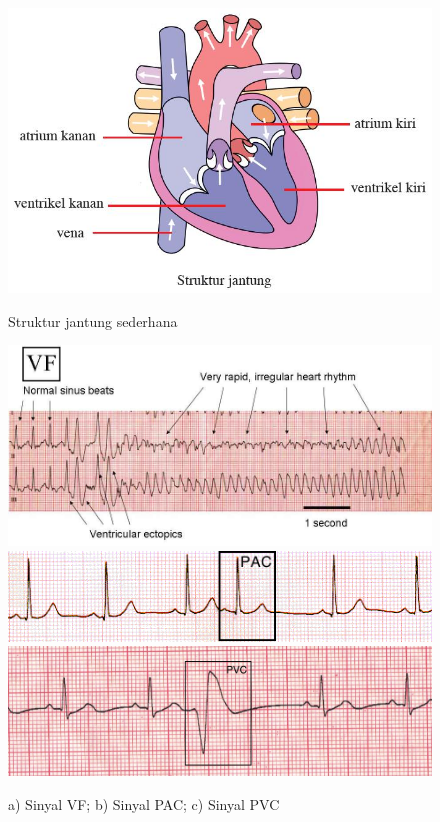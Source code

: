 \begin{figure}[H]
    \centering
    \includegraphics[scale=0.4]{images/jantung.jpg}
    \caption{Struktur jantung sederhana}
	\includegraphics[scale=1.2]{images/VF.jpg}
    \includegraphics[scale=0.5]{images/PAC1.png}
	\includegraphics[scale=0.25]{images/PVC1.png}
    \caption{a) Sinyal VF; b) Sinyal PAC; c) Sinyal PVC}
    \label{fig:contoh_aritmia}	
\end{figure}



